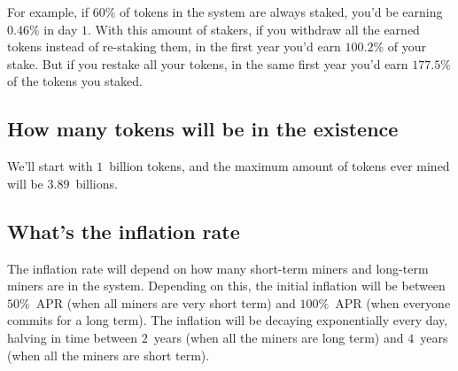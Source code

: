 \documentclass[longbibliography,nofootinbib,twocolumn]{revtex4-1}
\begin{document}
For example, if $60\%$ of tokens in the system are always staked, you'd be earning $0.46\%$ in day $1$.
With this amount of stakers, if you withdraw all the earned tokens instead of re-staking them, in the first year you'd earn $100.2\%$ of your stake.
But if you restake all your tokens, in the same first year you'd earn $177.5\%$ of the tokens you staked.

\subsection{How many tokens will be in the existence}
We'll start with $1$~billion tokens, and the maximum amount of tokens ever mined will be $3.89$~billions.

\subsection{What's the inflation rate}
The inflation rate will depend on how many short-term miners and long-term miners are in the system.
Depending on this, the initial inflation will be between $50\%$~APR (when all miners are very short term) and $100\%$~APR (when everyone commits for a long
term).
The inflation will be decaying exponentially every day, halving in time between $2$~years (when all the miners are long term)
and $4$~years (when all the miners are short term).


\end{document}
